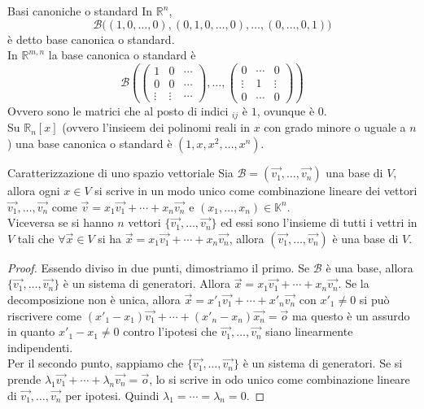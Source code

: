 \begin{SubDef}{Basi canoniche o standard}
  In $\mathbb{R}^n$,
  \begin{equation*}
    \mathscr{B}\bigl((1,0,\ldots,0),(0,1,0,\ldots,0),\ldots,(0,\ldots,0,1)\bigr)
  \end{equation*}
  è detto base canonica o standard.\\[\baselineskip]
  In $\mathbb{R}^{m,n}$ la base canonica o standard è
  \begin{equation*}
    \mathscr{B} \left(
      \begin{pmatrix}
        1 & 0 &\cdots\\
        0 & 0 & \cdots\\
        \vdots & \vdots & \cdots
      \end{pmatrix},\ldots,
      \begin{pmatrix}
        0 & \cdots & 0\\
        \vdots & 1 & \vdots\\
        0 & \cdots & 0
      \end{pmatrix}
    \right)
  \end{equation*}
  Ovvero sono le matrici che al posto di indici $_{ij}$ è $1$, ovunque è
  $0$.\\[\baselineskip]
  Su $\mathbb{R}_n[x]$ (ovvero l'insieem dei polinomi reali in $x$ con grado minore o
  uguale a $n$) una base canonica o standard è $(1,x,x^2,\ldots,x^n)$.
\end{SubDef}

\begin{Thm}{Caratterizzazione di uno spazio vettoriale}
  Sia $\mathscr{B}=(\vec{v_1},\ldots,\vec{v_n})$ una base di $V$, allora ogni $x\in V$
  si scrive in un modo unico come combinazione lineare dei vettori $\vec{v_1},\ldots,
  \vec{v_n}$ come $\vec{v}=x_1\vec{v_1}+\cdots+x_n\vec{v_n}$ e $(x_1,\ldots,x_n)\in
  \mathbb{K}^n$.\\
  Viceversa se si hanno $n$ vettori $\{\vec{v_1},\ldots,\vec{v_n}\}$ ed essi sono
  l'insieme di tutti i vettri in $V$ tali che $\forall \vec{x}\in V$ si ha
  $\vec{x}=x_1\vec{v_1}+\cdots+x_n\vec{v_n}$, allora $(\vec{v_1},\ldots,\vec{v_n})$ è
  una base di $V$.
\end{Thm}

\begin{proof}
  Essendo diviso in due punti, dimostriamo il primo. Se $\mathscr{B}$ è una base, allora
  $\{\vec{v_1},\ldots,\vec{v_n}\}$ è un sistema di generatori. Allora
  $\vec{x}=x_1\vec{v_1}+\cdots+x_n\vec{v_n}$. Se la decomposizione non è unica, allora
  $\vec{x}=x'_1\vec{v_1}+\cdots+x'_n\vec{v_n}$ con $x'_1\neq0$ si può riscrivere come
  $(x'_1-x_1)\vec{v_1}+\cdots+(x'_n-x_n)\vec{x_n}=\vec{o}$ ma questo è un assurdo in
  quanto $x'_1-x_1\neq0$ contro l'ipotesi che $\vec{v_1},\ldots,\vec{v_n}$ siano
  linearmente indipendenti.\\
  Per il secondo punto, sappiamo che $\{\vec{v_1},\ldots,\vec{v_n}\}$ è un sistema di
  generatori. Se si prende $\lambda_1\vec{v_1}+\cdots+\lambda_n\vec{v_n}=\vec{o}$, lo si
  scrive in odo unico come combinazione lineare di $\vec{v_1},\ldots,\vec{v_n}$ per
  ipotesi. Quindi $\lambda_1=\cdots=\lambda_n=0$.
\end{proof}

